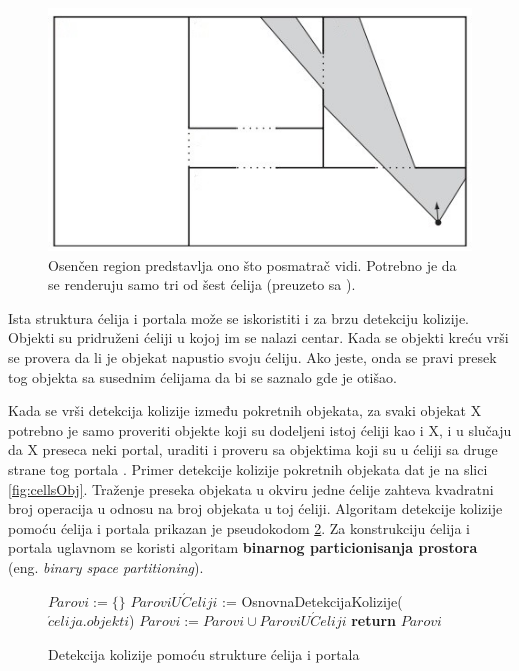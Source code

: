\documentclass[12pt,oneside]{memoir}
\begin{document}
\begin{figure}[h!]
	\begin{center}
	\includegraphics[scale=1]{cellsRooms.jpg}
	\end{center}
	\caption{
	Osenčen region predstavlja ono što posmatrač vidi. 
	Potrebno je da se renderuju samo tri od šest ćelija (preuzeto sa \cite{glavnaKnjiga}). }
	\label{fig:cellsRooms}
\end{figure}

Ista struktura ćelija i portala može se iskoristiti i za brzu detekciju kolizije. 
Objekti su pridruženi ćeliji u kojoj im se nalazi centar. Kada se objekti kreću vrši 
se provera da li je objekat napustio svoju ćeliju. Ako jeste, onda se pravi presek tog objekta
sa susednim ćelijama da bi se saznalo gde je otišao. 

Kada se vrši detekcija kolizije između pokretnih objekata, za svaki objekat X 
potrebno je samo proveriti objekte koji su dodeljeni istoj ćeliji kao i X, i u slučaju
da X preseca neki portal, uraditi i proveru sa objektima koji su u ćeliji sa druge strane tog portala \cite{cells}.
Primer detekcije kolizije pokretnih objekata dat je na slici \ref{fig:cellsObj}.
Traženje preseka objekata u okviru jedne ćelije zahteva kvadratni broj operacija u odnosu na broj objekata u toj ćeliji.
Algoritam detekcije kolizije pomoću ćelija i portala prikazan je pseudokodom \ref{alg:cell}.
Za konstrukciju ćelija i portala uglavnom se koristi algoritam 
\textbf{binarnog particionisanja prostora} (eng. {\em binary space partitioning}).

\begin{figure}[!h]
    \label{alg:cell}
	\begin{algorithmic}[1]
		\State $Parovi := \{ \}$
			\State $ParoviU\acute{C}eliji$ := OsnovnaDetekcijaKolizije($\acute{c}elija.objekti$)
			\State $Parovi:=Parovi \cup ParoviU\acute{C}eliji$
		\EndFor
		\State \textbf{return} $Parovi$
		\EndProcedure
	\end{algorithmic}
	\caption{Detekcija kolizije pomoću strukture ćelija i portala}
\end{figure}
\end{document}
